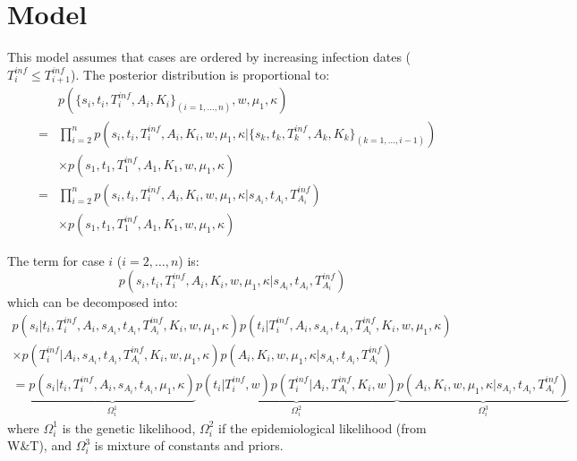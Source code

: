 \documentclass[10pt]{article}
\begin{document}
\section*{Model}
This model assumes that cases are ordered by increasing infection dates ($T_i^{inf} \leq T_{i+1}^{inf}$).
The posterior distribution is proportional to:
\begin{eqnarray}
& & p(\{s_i, t_i, T_i^{inf}, A_i, K_i\}_{(i=1,\ldots,n)}, w, \mu_1, \kappa)\\
& = & \prod_{i=2}^n p(s_i, t_i, T_i^{inf}, A_i, K_i, w, \mu_1, \kappa | \{s_k, t_k, T_k^{inf}, A_k, K_k\}_{(k=1,\ldots,i-1)}) \nonumber \\ 
& & \times p(s_1, t_1, T_1^{inf}, A_1, K_1, w, \mu_1, \kappa)\\
& = & \prod_{i=2}^n p(s_i, t_i, T_i^{inf}, A_i, K_i, w, \mu_1, \kappa | s_{A_i}, t_{A_i}, T_{A_i}^{inf}) \nonumber \\
& & \times p(s_1, t_1, T_1^{inf}, A_1, K_1, w, \mu_1, \kappa)
\end{eqnarray}



The term for case $i$ ($i=2,\ldots,n$) is:
\begin{equation}
 p(s_i, t_i, T_i^{inf}, A_i, K_i, w, \mu_1, \kappa | s_{A_i}, t_{A_i}, T_{A_i}^{inf})
\end{equation}
which can be decomposed into:
\begin{eqnarray}
p(s_i | t_i, T_i^{inf}, A_i, s_{A_i}, t_{A_i}, T_{A_i}^{inf}, K_i, w, \mu_1, \kappa)
  p(t_i | T_i^{inf}, A_i, s_{A_i}, t_{A_i}, T_{A_i}^{inf}, K_i, w, \mu_1, \kappa) & \nonumber \\
\times  p(T_i^{inf} | A_i, s_{A_i}, t_{A_i}, T_{A_i}^{inf}, K_i, w, \mu_1, \kappa)
    p(A_i, K_i, w, \mu_1, \kappa | s_{A_i}, t_{A_i}, T_{A_i}^{inf}) & \nonumber \\
= \underbrace{p(s_i | t_i, T_i^{inf}, A_i, s_{A_i}, t_{A_i}, \mu_1, \kappa)}_{\Omega_i^1}  
    \underbrace{p(t_i | T_i^{inf}, w)
		p(T_i^{inf} | A_i, T_{A_i}^{inf}, K_i, w)}_{\Omega_i^2}
    \underbrace{p(A_i, K_i, w, \mu_1, \kappa | s_{A_i}, t_{A_i}, T_{A_i}^{inf})}_{\Omega_i^3} &
\end{eqnarray}
\noindent where $\Omega_i^1$ is the genetic likelihood, $\Omega_i^2$ if the epidemiological likelihood (from W\&T), and $\Omega_i^3$ is mixture of constants and priors.
\\
\end{document}
